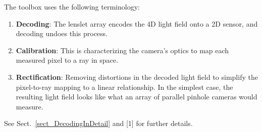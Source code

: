\documentclass[onecolumn]{article}
\begin{document}
The toolbox uses the following terminology:
\begin{enumerate}[leftmargin=1.5em,rightmargin=0.5cm]
\item \textbf{Decoding}: The lenslet array encodes the 4D light field onto a 2D sensor, and decoding undoes this process.
\item \textbf{Calibration}: This is characterizing the camera's optics to map each measured pixel to a ray in space.
\item \textbf{Rectification}: Removing distortions in the decoded light field to simplify the pixel-to-ray mapping to a linear relationship. In the simplest case, the resulting light field looks like what an array of parallel pinhole cameras would measure.
\end{enumerate}
See Sect.~\ref{sect_DecodingInDetail} and [1] for further details.
\end{document}

